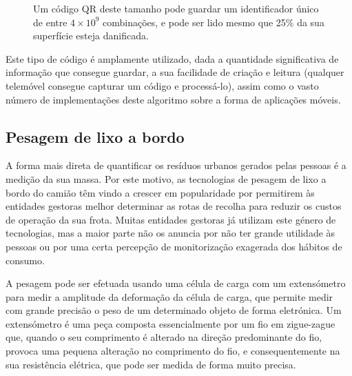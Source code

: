 \documentclass[11pt, a4paper, oneside]{book}
\begin{document}
\begin{figure}[ht]
  \centering
  
  \caption{Um código QR deste tamanho pode guardar um identificador único de entre $4 \times 10^{9}$ combinações, e pode ser lido mesmo que 25\% da sua superfície esteja danificada.}
\end{figure}

Este tipo de código é amplamente utilizado, dada a quantidade significativa de informação que consegue guardar, a sua facilidade de criação e leitura (qualquer telemóvel consegue capturar um código e processá-lo), assim como o vasto número de implementações deste algoritmo sobre a forma de aplicações móveis.

\subsection{Pesagem de lixo a bordo}

A forma mais direta de quantificar os resíduos urbanos gerados pelas pessoas é a medição da sua massa. Por este motivo, as tecnologias de pesagem de lixo a bordo do camião têm vindo a crescer em popularidade por permitirem às entidades gestoras melhor determinar as rotas de recolha para reduzir os custos de operação da sua frota. Muitas entidades gestoras já utilizam este género de tecnologias, mas a maior parte não os anuncia por não ter grande utilidade às pessoas ou por uma certa percepção de monitorização exagerada dos hábitos de consumo.

A pesagem pode ser efetuada usando uma célula de carga com um extensómetro para medir a amplitude da deformação da célula de carga, que permite medir com grande precisão o peso de um determinado objeto de forma eletrónica. Um extensómetro é uma peça composta essencialmente por um fio em zigue-zague que, quando o seu comprimento é alterado na direção predominante do fio, provoca uma pequena alteração no comprimento do fio, e consequentemente na sua resistência elétrica, que pode ser medida de forma muito precisa.
\end{document}
